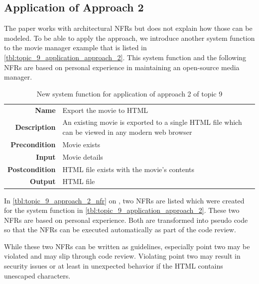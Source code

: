\subsection{Application of Approach 2}

The paper works with architectural \glspl{NFR} but does not explain how those can be modeled.
To be able to apply the approach, we introduce another system function to the movie manager example that is listed in \autoref{tbl:topic_9_application_approach_2}.
This system function and the following \glspl{NFR} are based on personal experience in maintaining an open-source media manager.

\begin{table}[h!]
	\centering
	\caption{New system function for application of approach 2 of topic 9}
	\label{tbl:topic_9_application_approach_2}
	\begin{tabular}{rp{}}
		\textbf{Name}          & Export the movie to HTML \\
		\textbf{Description}   & An existing movie is exported to a single HTML file which can be viewed in any modern web browser \\
		\textbf{Precondition}  & Movie exists \\
		\textbf{Input}         & Movie details \\
		\textbf{Postcondition} & HTML file exists with the movie's contents \\
		\textbf{Output}        & HTML file \\
	\end{tabular}
\end{table}

In \autoref{tbl:topic_9_approach_2_nfr} on , two \glspl{NFR} are listed which were created for the system function in \autoref{tbl:topic_9_application_approach_2}. 
These two \glspl{NFR} are based on personal experience.
Both are transformed into pseudo code so that the \glspl{NFR} can be executed automatically as part of the code review.

While these two \glspl{NFR} can be written as guidelines, especially point two may be violated and may slip through code review. Violating point two may result in security issues or at least in unexpected behavior if the HTML contains unescaped characters.

